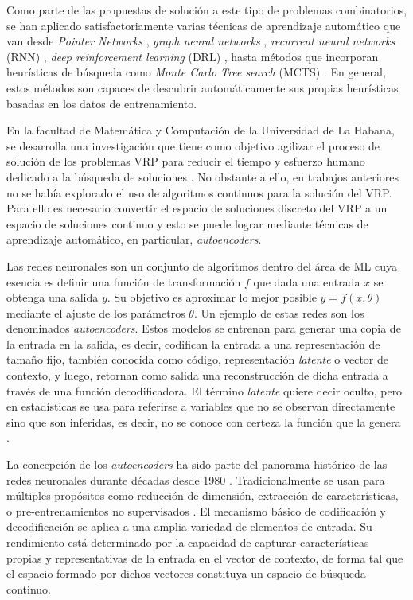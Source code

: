 Como parte de las propuestas de solución a este tipo de problemas combinatorios, se han aplicado satisfactoriamente varias técnicas de aprendizaje automático que van desde \textit{Pointer Networks} \cite{PointerNVinyals, BelloNCORL}, \textit{graph neural networks} \cite{KhaliGraph, AlphaGoMCTS}, \textit{recurrent neural networks} (RNN) \cite{SemiSupAndrew, NazariRL}, \textit{deep reinforcement learning} (DRL) \cite{Nazari2018DeepRL, VeraHVRP, Joe2020DeepRL}, hasta métodos que incorporan heurísticas de búsqueda como \textit{Monte Carlo Tree search} (MCTS) \cite{AlphaGoMCTS, Xing2020AGNMCTS}. En general, estos métodos son capaces de descubrir automáticamente sus propias heurísticas basadas en los datos de entrenamiento.


En la facultad de Matemática y Computación de la Universidad de La Habana, se desarrolla una investigación que tiene como objetivo agilizar el proceso de solución de los problemas VRP para reducir el tiempo y esfuerzo humano dedicado a la búsqueda de soluciones \cite{Camila, Daniela, HectorMasson, JJ}. No obstante a ello, en trabajos anteriores no se había explorado el uso de algoritmos continuos para la solución del VRP. Para ello es necesario convertir el espacio de soluciones discreto del VRP a un espacio de soluciones continuo y esto se puede lograr mediante técnicas de aprendizaje automático, en particular, \textit{autoencoders}.

Las redes neuronales son un conjunto de algoritmos dentro del área de ML cuya esencia es definir una función de transformación $f$ que dada una entrada $x$ se obtenga una salida $y$. Su objetivo es aproximar lo mejor posible $y = f(x, \theta)$ mediante el ajuste de los parámetros $\theta$. Un ejemplo de estas redes son los denominados \textit{autoencoders}. Estos modelos se entrenan para generar una copia de la entrada en la salida, es decir, codifican la entrada a una representación de tamaño fijo, también conocida como código, representación \textit{latente} o vector de contexto, y luego, retornan como salida una reconstrucción de dicha entrada a través de una función decodificadora. El término \textit{latente} quiere decir oculto, pero en estadísticas se usa para referirse a variables que no se observan directamente sino que son inferidas, es decir, no se conoce con certeza la función que la genera \cite{BengioGood}. 

La concepción de los \textit{autoencoders} ha sido parte del panorama histórico de las redes neuronales durante décadas desde 1980 \cite{LeCun1987, HintonAutoencoders}. Tradicionalmente se usan para múltiples propósitos como reducción de dimensión, extracción de características, o pre-entrenamientos no supervisados \cite{Hinton2006, Bengio09, BengioGood}. El mecanismo básico de codificación y decodificación se aplica a una amplia variedad de elementos de entrada.
 Su rendimiento está determinado por la capacidad de capturar características propias y representativas de la entrada en el vector de contexto, de forma tal que el espacio formado por dichos vectores constituya un espacio de búsqueda continuo.
 
